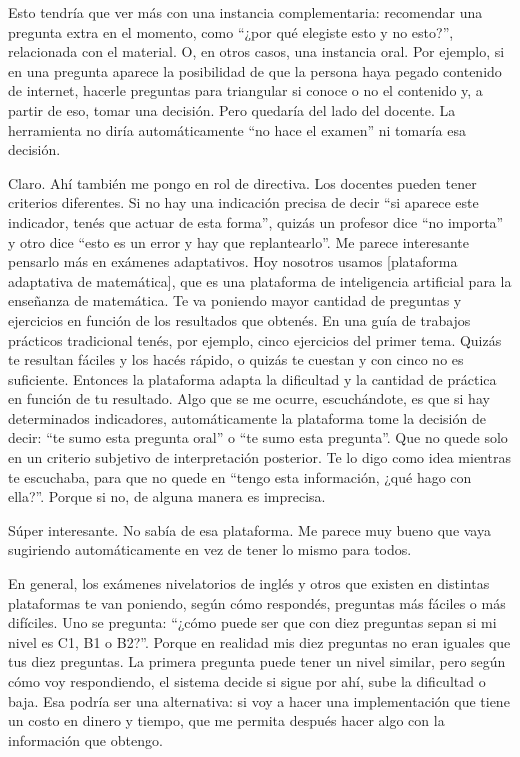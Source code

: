 \begin{description}[leftmargin=0cm, labelsep=0.5cm, style=nextline]
Esto tendría que ver más con una instancia complementaria: recomendar una pregunta extra en el momento, como ``¿por qué elegiste esto y no esto?'', relacionada con el material. O, en otros casos, una instancia oral. Por ejemplo, si en una pregunta aparece la posibilidad de que la persona haya pegado contenido de internet, hacerle preguntas para triangular si conoce o no el contenido y, a partir de eso, tomar una decisión.
Pero quedaría del lado del docente. La herramienta no diría automáticamente ``no hace el examen'' ni tomaría esa decisión.
\item[\textbf{Entrevistada:}] Claro. Ahí también me pongo en rol de directiva. Los docentes pueden tener criterios diferentes. Si no hay una indicación precisa de decir ``si aparece este indicador, tenés que actuar de esta forma'', quizás un profesor dice ``no importa'' y otro dice ``esto es un error y hay que replantearlo''.
Me parece interesante pensarlo más en exámenes adaptativos. Hoy nosotros usamos [plataforma adaptativa de matemática], que es una plataforma de inteligencia artificial para la enseñanza de matemática. Te va poniendo mayor cantidad de preguntas y ejercicios en función de los resultados que obtenés.
En una guía de trabajos prácticos tradicional tenés, por ejemplo, cinco ejercicios del primer tema. Quizás te resultan fáciles y los hacés rápido, o quizás te cuestan y con cinco no es suficiente. Entonces la plataforma adapta la dificultad y la cantidad de práctica en función de tu resultado.
Algo que se me ocurre, escuchándote, es que si hay determinados indicadores, automáticamente la plataforma tome la decisión de decir: ``te sumo esta pregunta oral'' o ``te sumo esta pregunta''. Que no quede solo en un criterio subjetivo de interpretación posterior. Te lo digo como idea mientras te escuchaba, para que no quede en ``tengo esta información, ¿qué hago con ella?''. Porque si no, de alguna manera es imprecisa.
\item[\textbf{Entrevistadores:}] Súper interesante. No sabía de esa plataforma. Me parece muy bueno que vaya sugiriendo automáticamente en vez de tener lo mismo para todos.
\item[\textbf{Entrevistada:}] En general, los exámenes nivelatorios de inglés y otros que existen en distintas plataformas te van poniendo, según cómo respondés, preguntas más fáciles o más difíciles. Uno se pregunta: ``¿cómo puede ser que con diez preguntas sepan si mi nivel es C1, B1 o B2?''. Porque en realidad mis diez preguntas no eran iguales que tus diez preguntas.
La primera pregunta puede tener un nivel similar, pero según cómo voy respondiendo, el sistema decide si sigue por ahí, sube la dificultad o baja. Esa podría ser una alternativa: si voy a hacer una implementación que tiene un costo en dinero y tiempo, que me permita después hacer algo con la información que obtengo.

\end{description}
